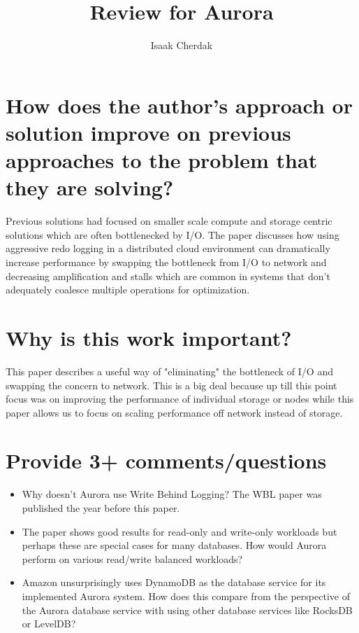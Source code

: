 \documentclass{article}
\title{Review for Aurora}
\author{Isaak Cherdak}
\begin{document}
\maketitle

\section{How does the author's approach or solution improve on previous
approaches to the problem that they are solving?}

Previous solutions had focused on smaller scale compute and storage centric
solutions which are often bottlenecked by I/O. The paper discusses how using
aggressive redo logging in a distributed cloud environment can dramatically
increase performance by swapping the bottleneck from I/O to network and
decreasing amplification and stalls which are common in systems that don't
adequately coalesce multiple operations for optimization.

\section{Why is this work important?}

This paper describes a useful way of "eliminating" the bottleneck of I/O and
swapping the concern to network. This is a big deal because up till this point
focus was on improving the performance of individual storage or nodes while this
paper allows us to focus on scaling performance off network instead of storage.

\section{Provide 3+ comments/questions}

\begin{itemize}
  \item Why doesn't Aurora use Write Behind Logging? The WBL paper was published
    the year before this paper.
  \item The paper shows good results for read-only and write-only workloads but
    perhaps these are special cases for many databases. How would Aurora
    perform on various read/write balanced workloads?
  \item Amazon unsurprisingly uses DynamoDB as the database service for its
    implemented Aurora system. How does this compare from the perspective of the
    Aurora database service with using other database services like RocksDB or
    LevelDB?
\end{itemize}
\end{document}
